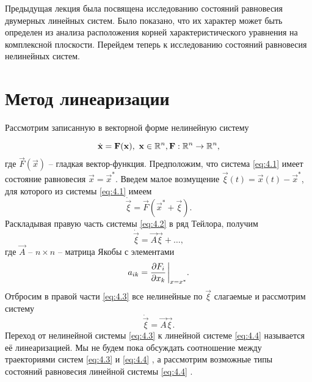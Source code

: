 Предыдущая лекция была посвящена исследованию состояний равновесия двумерных линейных систем. Было показано, что их характер может быть определен из анализа расположения корней характеристического уравнения на комплексной плоскости. Перейдем теперь к исследованию состояний равновесия нелинейных систем.

\section{Метод линеаризации}%
\label{sec:metod_linearizatsii}

Рассмотрим записанную в векторной форме нелинейную систему

\begin{equation}
        \label{eq:4.1}
        \dot{\mathbf x} = \mathbf F(\mathbf x), ~ \mathbf x \in \mathbb{R}^n, \mathbf F: \mathbb{R}^n \to \mathbb{R}^n,    
\end{equation}
где $\vec F(\vec x)$ -- гладкая вектор-функция. Предположим, что система \eqref{eq:4.1}  имеет состояние равновесия $\vec x = \vec x^*$. Введем малое возмущение $\vec \xi(t) = \vec x(t) - \vec x^*    $,
для которого из системы \eqref{eq:4.1} имеем
\begin{equation}
        \label{eq:4.2}
        \dot{\vec \xi} = \vec F( \vec x^* + \vec \xi).  
\end{equation}
Раскладывая правую часть системы \eqref{eq:4.2} в ряд Тейлора, получим
\begin{equation}
        \label{eq:4.3}
        \dot{\vec \xi} = \vec A \vec \xi + \dots,
\end{equation}
где $\vec A$ -- $n \times n$ -- матрица Якобы с элементами
\begin{equation}
        \label{eq:}
        a_{ik} = \pdv{F_i}{x_k} \eval_{x=x^*}.
\end{equation}
Отбросим в правой части \eqref{eq:4.3} все нелинейные по $\vec \xi$ слагаемые и рассмотрим систему
\begin{equation}
        \label{eq:4.4}
        \dot{\vec \xi} = \vec A \vec \xi.
\end{equation}
Переход от нелинейной системы \eqref{eq:4.3}  к линейной системе \eqref{eq:4.4} называется её линеаризацией. Мы не будем пока обсуждать соотношение между траекториями систем \eqref{eq:4.3} и \eqref{eq:4.4} , а рассмотрим возможные типы состояний равновесия линейной системы \eqref{eq:4.4} .

